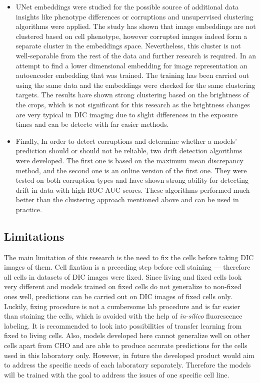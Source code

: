 \begin{itemize}
    \item UNet embeddings were studied for the possible source of additional data insights like phenotype differences or corruptions and unsupervised clustering algorithms were applied. The study has shown that image embeddings are not clustered based on cell phenotype, however corrupted images indeed form a separate cluster in the embeddings space. Nevertheless, this cluster is not well-separable from the rest of the data and further research is required. In an attempt to find a lower dimensional embedding for image representation an autoencoder embedding that was trained. The training has been carried out using the same data and the embeddings were checked for the same clustering targets. The results have shown strong clustering based on the brightness of the crops, which is not significant for this research as the brightness changes are very typical in DIC imaging due to slight differences in the exposure times and can be detecte with far easier methods.
    
    \item Finally, In order to detect corruptions and determine whether a models' prediction should or should not be reliable, two drift detection algorithms were developed. The first one is based on the maximum mean discrepancy method, and the second one is an online version of the first one. They were tested on both corruption types and have shown strong ability for detecting drift in data with high ROC-AUC scores. These algorithms performed much better than the clustering approach mentioned above and can be used in practice.
\end{itemize}

\subsection{Limitations}
The main limitation of this research is the need to fix the cells before taking DIC images of them. Cell fixation is a preceding step before cell staining --- therefore all cells in datasets of DIC images were fixed. Since living and fixed cells look very different and models trained on fixed cells do not generalize to non-fixed ones well, predictions can be carried out on DIC images of fixed cells only. Luckily, fixing procedure is not a cumbersome lab procedure and is far easier than staining the cells, which is avoided with the help of \textit{in-silico} fluorescence labeling. It is recommended to look into possibilities of transfer learning from fixed to living cells. 
Also, models developed here cannot generalize well on other cells apart from CHO and are able to produce accurate predictions for the cells used in this laboratory only. However, in future the developed product would aim to address the specific needs of each laboratory separately. Therefore the models will be trained with the goal to address the issues of one specific cell line. 


